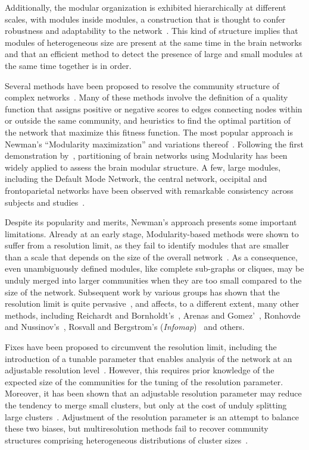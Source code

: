 Additionally, the modular organization is exhibited hierarchically at different scales, with modules inside modules, a construction that is thought to confer robustness and adaptability to the network~\cite{meunier2010}. This kind of structure implies that modules of heterogeneous size are present at the same time in the brain networks and that an efficient method to detect the presence of large and small modules at the same time together is in order.

Several methods have been proposed to resolve the community structure of complex networks~\cite{fortunato2010,lancichinetti2009}.
Many of these methods involve the definition of a quality function that assigns positive or negative scores to edges connecting nodes within or outside the same community, and heuristics to find the optimal partition of the network that maximize this fitness function. The most popular approach is Newman's ``Modularity maximization'' and variations thereof~\cite{newman2006}.
Following the first demonstration by~\cite{schwarz2008}, partitioning of brain networks using Modularity has been widely applied to assess the brain modular structure.
A few, large modules, including the Default Mode Network, the central network, occipital and frontoparietal networks have been observed with remarkable consistency across subjects and studies~\cite{meunier2010,wang2010}. 

Despite its popularity and merits, Newman’s approach presents some important limitations.
Already at an early stage, Modularity-based methods were shown to suffer from a resolution limit, as they fail to identify modules that are smaller than a scale that depends on the size of the overall network~\cite{fortunato2007}.
As a consequence, even unambiguously defined modules, like complete sub-graphs or cliques, may be unduly merged into larger communities when they are too small compared to the size of the network. Subsequent work by various groups has shown that the resolution limit is quite pervasive~\cite{lancichinetti2009,traag2011,squartini2015,lancichinetti2011,kawamoto2015}, and affects, to a different extent, many other methods, including Reichardt and Bornholdt’s~\cite{reichardt2006}, Arenas and Gomez'~\cite{arenas2008}, Ronhovde and Nussinov's~\cite{ronhovde2009}, Rosvall and Bergstrom's (\emph{Infomap})~\cite{rosvall2008,kawamoto2015} and others.

Fixes have been proposed to circumvent the resolution limit, including the introduction of a tunable parameter that enables analysis of the network at an adjustable resolution level~\cite{reichardt2006,ronhovde2010,yeo2011}. However, this requires prior knowledge of the expected size of the communities for the tuning of the resolution parameter. Moreover, it has been shown that an  adjustable resolution parameter may reduce the tendency to merge small clusters, but only at the cost of unduly splitting large clusters~\cite{lancichinetti2011}. Adjustment of the resolution parameter is an attempt to balance these two biases, but multiresolution methods fail to recover community structures comprising heterogeneous distributions of cluster sizes~\cite{lancichinetti2011}. 

